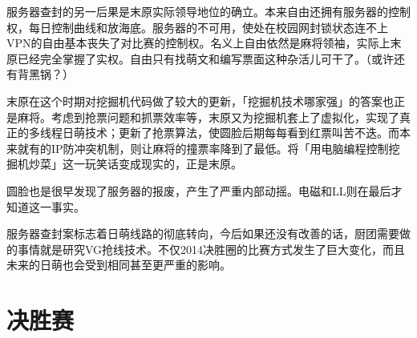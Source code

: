 服务器查封的另一后果是末原实际领导地位的确立。本来自由还拥有服务器的控制权，每日控制曲线和放海底。服务器的不可用，使处在校园网封锁状态连不上VPN的自由基本丧失了对比赛的控制权。名义上自由依然是麻将领袖，实际上末原已经完全掌握了实权。自由只有找萌文和编写票面这种杂活儿可干了。（或许还有背黑锅？）

末原在这个时期对挖掘机代码做了较大的更新，「挖掘机技术哪家强」的答案也正是麻将。考虑到抢票问题和抓票效率等，末原又为挖掘机套上了虚拟化，实现了真正的多线程日萌技术；更新了抢票算法，使圆脸后期每每看到红票叫苦不迭。而本来就有的IP防冲突机制，则让麻将的撞票率降到了最低。将「用电脑编程控制挖掘机炒菜」这一玩笑话变成现实的，正是末原。

圆脸也是很早发现了服务器的报废，产生了严重内部动摇。电磁和LL则在最后才知道这一事实。

服务器查封案标志着日萌线路的彻底转向，今后如果还没有改善的话，厨团需要做的事情就是研究VG抢线技术。不仅2014决胜圈的比赛方式发生了巨大变化，而且未来的日萌也会受到相同甚至更严重的影响。

\chapter{决胜赛}

